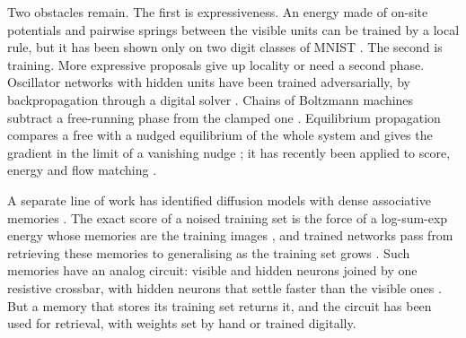 \documentclass{article}
\begin{document}
Two obstacles remain. The first is expressiveness. An energy made of on-site
potentials and pairwise springs between the visible units can be trained by a
local rule, but it has been shown only on two digit classes of MNIST
\citep{firstpaper2025}. The second is training. More expressive proposals
give up locality or need a second phase. Oscillator networks with hidden units
have been trained adversarially, by backpropagation through a digital solver
\citep{wangachour2026}. Chains of Boltzmann machines subtract a free-running
phase from the clamped one \citep{hinton2002training,jelincic2025dtm}.
Equilibrium propagation compares a free with a nudged equilibrium of the whole
system and gives the gradient in the limit of a vanishing nudge
\citep{scellier2017equilibrium}; it has recently been applied to score, energy
and flow matching
\citep{de2026symmetric,gower2026potentialep,gower2026floweqprop}.

A separate line of work has identified diffusion models with dense
associative memories \citep{krotov2016dense,ramsauer2021hopfield}. The exact
score of a noised training set is the force of a log-sum-exp energy whose
memories are the training images \citep{hoover2023memory,ambrogioni2024search},
and trained networks pass from retrieving these memories to generalising as
the training set grows \citep{pham2026emergence}. Such memories have an analog
circuit: visible and hidden neurons joined by one resistive crossbar, with
hidden neurons that settle faster than the visible ones
\citep{bacvanski2025dense}. But a memory that stores its training set returns
it, and the circuit has been used for retrieval, with weights set by hand or
trained digitally.
\end{document}
